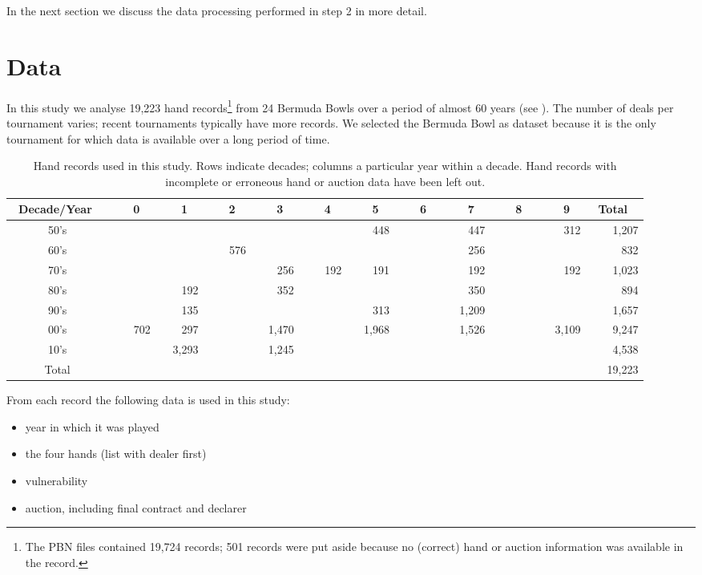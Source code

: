 \documentclass{icga}
\begin{document}
In the next section we discuss the data processing performed in step 2
in more detail.

\section{Data}
\label{sec:data}

In this study we analyse 19,223 hand records\footnote{%
  The PBN files contained 19,724 records; 501 records were put aside
  because no (correct) hand or auction information was available in
  the record.}  from 24 Bermuda Bowls over a period of almost 60 years (see
).  The number of deals per tournament varies; recent
tournaments typically have more records.  We selected the Bermuda Bowl
as dataset because it is the only tournament for which data is
available over a long period of time.

\begin{table}
\centering\footnotesize
\begin{tabular}{|c|r|r|r|r|r|r|r|r|r|r|r|}
\hline
\bf\ Decade/Year \ &
\bf \ \ \ 0 \ &\bf \ \ \ 1 \ &\bf \ \ \ 2 \ &\bf \ \ \ 3 \ &\bf \ \ \ 4 \ &
\bf \ \ \ 5 \ &\bf \ \ \ 6 \ &\bf \ \ \ 7 \ &\bf \ \ \ 8 \ &\bf \ \ \ 9 \ &
\bf \ Total \ \\ \hline\hline
50's &  &  &  &  &  & 448 &  & 447 &  & 312 & 1,207 \\ \hline
60's &  &  & 576 &  &  &  &  & 256 &  &  & 832 \\ \hline
70's &  &  &  & 256 & 192 & 191 &  & 192 &  & 192 & 1,023 \\ \hline
80's &  & 192 &  & 352 &  &  &  & 350 &  &  & 894 \\ \hline
90's &  & 135 &  &  &  & 313 &  & 1,209 &  &  & 1,657 \\ \hline
00's & 702 & 297 &  & 1,470 &  & 1,968 &  & 1,526 &  & 3,109 & 9,247 \\ \hline
10's &  & 3,293 &  & 1,245 &  &  &  &  &  &  & 4,538 \\ \hline\hline
Total &  &  &  &  &  &  &  &  &  &  & 19,223 \\ \hline
\hline
\end{tabular}
\caption{Hand records used in this study. Rows indicate decades;
  columns a particular year within  a decade. Hand records with
  incomplete or erroneous hand or auction data have been left out.}
\label{tbl:data}
\end{table}

From each record the following data is used in this study: 
\begin{itemize}
\item year in which it was played
\item the four hands (list with dealer first)
\item vulnerability
\item auction, including final contract and declarer
\end{itemize}
\end{document}

